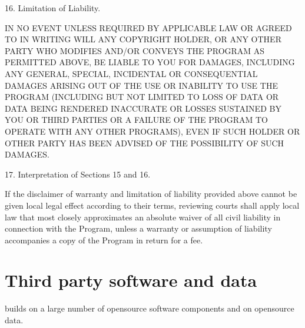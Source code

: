 \documentclass[letterpaper,10pt,english]{sphinxmanual}
\begin{document}
\begin{sphinxVerbatim}[commandchars=\\\{\}]
 16. Limitation of Liability.

   IN NO EVENT UNLESS REQUIRED BY APPLICABLE LAW OR AGREED TO IN WRITING WILL
   ANY COPYRIGHT HOLDER, OR ANY OTHER PARTY WHO MODIFIES AND/OR CONVEYS THE
   PROGRAM AS PERMITTED ABOVE, BE LIABLE TO YOU FOR DAMAGES, INCLUDING ANY
   GENERAL, SPECIAL, INCIDENTAL OR CONSEQUENTIAL DAMAGES ARISING OUT OF THE USE
   OR INABILITY TO USE THE PROGRAM (INCLUDING BUT NOT LIMITED TO LOSS OF DATA
   OR DATA BEING RENDERED INACCURATE OR LOSSES SUSTAINED BY YOU OR THIRD
   PARTIES OR A FAILURE OF THE PROGRAM TO OPERATE WITH ANY OTHER PROGRAMS),
   EVEN IF SUCH HOLDER OR OTHER PARTY HAS BEEN ADVISED OF THE POSSIBILITY OF
   SUCH DAMAGES.

 17. Interpretation of Sections 15 and 16.

   If the disclaimer of warranty and limitation of liability provided above
   cannot be given local legal effect according to their terms, reviewing
   courts shall apply local law that most closely approximates an absolute
   waiver of all civil liability in connection with the Program, unless a
   warranty or assumption of liability accompanies a copy of the Program in
   return for a fee.
\end{sphinxVerbatim}


\chapter{Third party software and data}
\label{\detokenize{04-appendix/license_3rdParty:third-party-software-and-data}}\label{\detokenize{04-appendix/license_3rdParty::doc}}
\sphinxAtStartPar
{} builds on a large number of open\sphinxhyphen{}source software
components and on open\sphinxhyphen{}source data.
\end{document}
